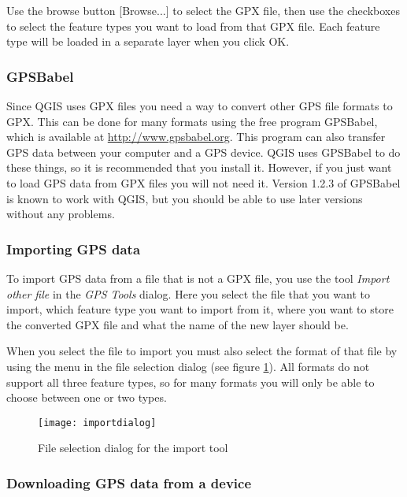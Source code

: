 Use the browse button {[}Browse...{]} to select the GPX file, then use the
checkboxes to select the feature types you want to load from that
GPX file. Each feature type will be loaded in a separate layer when
you click OK.

\subsubsection{GPSBabel}

Since QGIS uses GPX files you need a way to convert other GPS file
formats to GPX. This can be done for many formats using the free program
GPSBabel, which is available at \url{http://www.gpsbabel.org}. This
program can also transfer GPS data between your computer and a GPS
device. QGIS uses GPSBabel to do these things, so it is recommended
that you install it. However, if you just want to load GPS data from
GPX files you will not need it. Version 1.2.3 of GPSBabel is known
to work with QGIS, but you should be able to use later versions without
any problems.


\subsubsection{Importing GPS data}

To import GPS data from a file that is not a GPX file, you use the
tool \emph{Import other file} in the \emph{GPS Tools} dialog. Here
you select the file that you want to import, which feature type you
want to import from it, where you want to store the converted GPX
file and what the name of the new layer should be.

When you select the file to import you must also select the format
of that file by using the menu in the file selection dialog (see figure
\ref{figure importdialog}). All formats do not support all three
feature types, so for many formats you will only be able to choose
between one or two types.

\begin{figure}[ht]
   \begin{center}
\caption{\label{figure importdialog}File selection dialog for the import
tool}
\texttt{[image: importdialog]}
   \end{center}
\end{figure}

\subsubsection{Downloading GPS data from a device}

